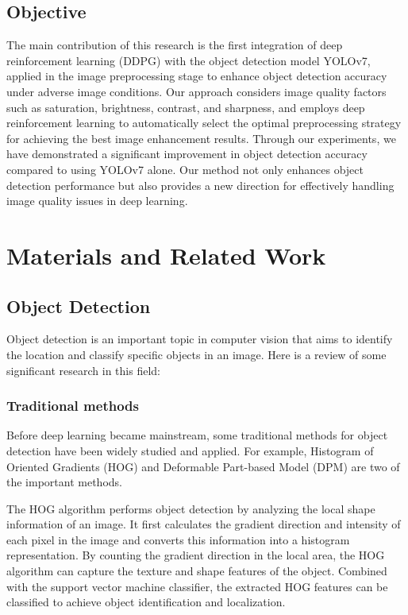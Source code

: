 \documentclass{PHlab-thesis}
\begin{document}
\section{Objective}
The main contribution of this research is the first integration of deep reinforcement learning (DDPG) with the object detection model YOLOv7, applied in the image preprocessing stage to enhance object detection accuracy under adverse image conditions. Our approach considers image quality factors such as saturation, brightness, contrast, and sharpness, and employs deep reinforcement learning to automatically select the optimal preprocessing strategy for achieving the best image enhancement results. Through our experiments, we have demonstrated a significant improvement in object detection accuracy compared to using YOLOv7 alone. Our method not only enhances object detection performance but also provides a new direction for effectively handling image quality issues in deep learning.


\chapter{Materials and Related Work}
\section{Object Detection}
Object detection is an important topic in computer vision that aims to identify the location and classify specific objects in an image. Here is a review of some significant research in this field:

\subsection{Traditional methods}
Before deep learning became mainstream, some traditional methods for object detection have been widely studied and applied. For example, Histogram of Oriented Gradients (HOG) \cite{dalal2005histograms} and Deformable Part-based Model (DPM) \cite{felzenszwalb2009object} are two of the important methods.

The HOG algorithm performs object detection by analyzing the local shape information of an image. It first calculates the gradient direction and intensity of each pixel in the image and converts this information into a histogram representation. By counting the gradient direction in the local area, the HOG algorithm can capture the texture and shape features of the object. Combined with the support vector machine classifier, the extracted HOG features can be classified to achieve object identification and localization. 
\end{document}
